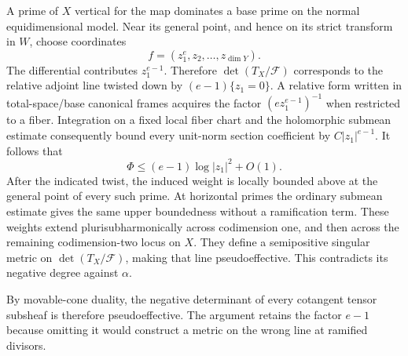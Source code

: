 A prime of $X$ vertical for the map dominates a base prime on the
normal equidimensional model.  Near its general point, and hence on
its strict transform in $W$, choose coordinates
\[
 f=(z_1^e,z_2,\ldots,z_{\dim Y}).
\]
The differential contributes $z_1^{e-1}$.  Therefore
$\det(T_X/\mathcal F)$ corresponds to the relative adjoint line
twisted down by $(e-1)\{z_1=0\}$.
A relative form written in total-space/base canonical frames acquires
the factor $(ez_1^{e-1})^{-1}$ when restricted to a fiber.
Integration on a fixed local fiber chart and the holomorphic submean
estimate consequently bound every unit-norm section coefficient by
$C|z_1|^{e-1}$.  It follows that
\[
 \Phi\le(e-1)\log|z_1|^2+O(1).
\]
After the indicated twist, the induced weight is locally bounded
above at the general point of every such prime.  At horizontal primes
the ordinary submean estimate gives the same upper boundedness without
a ramification term.  These weights extend plurisubharmonically across
codimension one, and then across the remaining codimension-two locus
on $X$.  They define a semipositive singular metric on
$\det(T_X/\mathcal F)$, making that line pseudoeffective.  This
contradicts its negative degree against $\alpha$.

By movable-cone duality, the negative determinant of every cotangent
tensor subsheaf is therefore pseudoeffective.  The argument retains the
factor $e-1$ because omitting it would construct a metric on the wrong
line at ramified divisors.
